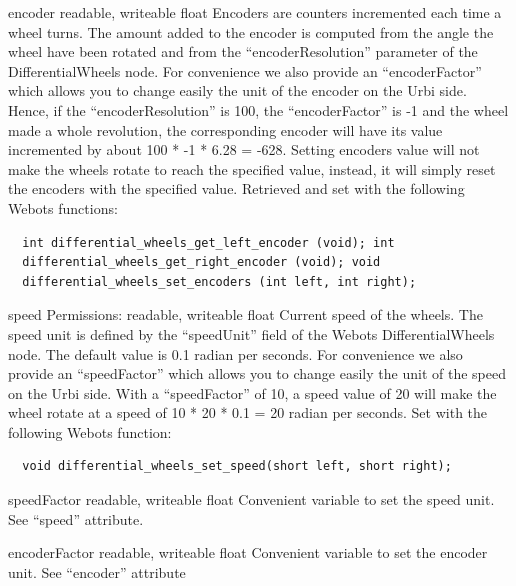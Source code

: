 \noindent
\begin{itemize}
\begin{attribute}{encoder}
  {readable, writeable}
  {float}
  {}
  Encoders are counters incremented each time a wheel
  turns. The amount added to the encoder is computed from the angle
  the wheel have been rotated and from the ``encoderResolution''
  parameter of the DifferentialWheels node. For convenience we also
  provide an ``encoderFactor'' which allows you to change easily the
  unit of the encoder on the Urbi side.  Hence, if the
  ``encoderResolution'' is 100, the ``encoderFactor'' is -{}1 and the
  wheel made a whole revolution, the corresponding encoder will have
  its value incremented by about 100 * -{}1 * 6.28 = -{}628.  Setting
  encoders value will not make the wheels rotate to reach the
  specified value, instead, it will simply reset the encoders with the
  specified value.  Retrieved and set with the following Webots
  functions:


\begin{lstlisting}
  int differential_wheels_get_left_encoder (void); int
  differential_wheels_get_right_encoder (void); void
  differential_wheels_set_encoders (int left, int right);
\end{lstlisting}
\end{attribute}

\begin{attribute}{speed}
  {Permissions: readable, writeable}
  {float}
  {}
  Current speed of the wheels. The speed unit is defined
  by the ``speedUnit'' field of the Webots DifferentialWheels node. The
  default value is 0.1 radian per seconds. For convenience we also
  provide an ``speedFactor'' which allows you to change easily the unit
  of the speed on the Urbi side.  With a ``speedFactor'' of 10, a speed
  value of 20 will make the wheel rotate at a speed of 10 * 20 * 0.1 =
  20 radian per seconds.  Set with the following Webots function:


\begin{lstlisting}
  void differential_wheels_set_speed(short left, short right);
\end{lstlisting}
\end{attribute}

\begin{attribute}{speedFactor}
  {readable, writeable}
  {float}
  {}
  Convenient variable to set the speed unit. See ``speed''
  attribute.
\end{attribute}

\begin{attribute}{encoderFactor}
  {readable, writeable}
  {float}
  {}
  Convenient variable to set the encoder unit. See
  ``encoder'' attribute
\end{attribute}

\end{itemize}

